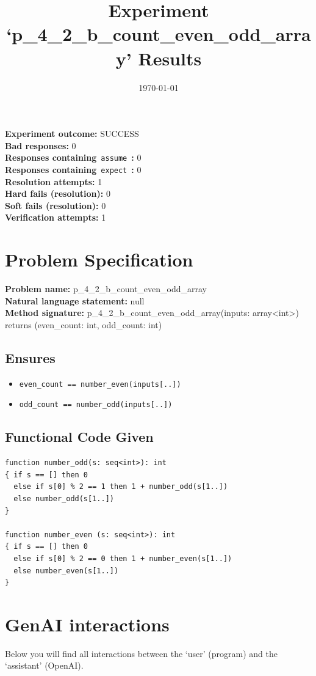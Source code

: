 \documentclass{article}
\begin{document}
\title{Experiment `p\_4\_2\_b\_count\_even\_odd\_array' Results}
\author{\today}
\date{}
\maketitle
\textbf{Experiment outcome: }SUCCESS
\\\textbf{Bad responses: }0
\\\textbf{Responses containing}~\texttt{assume}~\textbf{: }0
\\\textbf{Responses containing}~\texttt{expect}~\textbf{: }0
\\\textbf{Resolution attempts: }1
\\\textbf{Hard fails (resolution): }0
\\\textbf{Soft fails (resolution): }0
\\\textbf{Verification attempts: }1
\section*{Problem Specification}
\textbf{Problem name: }p\_4\_2\_b\_count\_even\_odd\_array
\\\textbf{Natural language statement: }null
\\\textbf{Method signature: }p\_4\_2\_b\_count\_even\_odd\_array(inputs: array<int>) returns (even\_count: int, odd\_count: int)
\subsection*{Ensures}
\begin{itemize}
\item \texttt{even\_count == number\_even(inputs[..])}
\item \texttt{odd\_count == number\_odd(inputs[..])}
\end{itemize}
\subsection*{Functional Code Given}
\begin{lstlisting}
function number_odd(s: seq<int>): int
{ if s == [] then 0
  else if s[0] % 2 == 1 then 1 + number_odd(s[1..])
  else number_odd(s[1..])
}

function number_even (s: seq<int>): int
{ if s == [] then 0
  else if s[0] % 2 == 0 then 1 + number_even(s[1..])
  else number_even(s[1..])
}
\end{lstlisting}
\clearpage
\section*{GenAI interactions}
Below you will find all interactions between the `user' (program) and the `assistant' (OpenAI).
\end{document}
